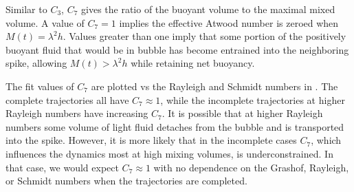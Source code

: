 Similar to $C_3$, $C_7$ gives the ratio of the buoyant volume to the maximal mixed volume.
A value of $C_7 = 1$ implies the effective Atwood number is zeroed when $M(t) = \lambda^2 h$.
Values greater than one imply that some portion of the positively buoyant fluid that would be in bubble has become entrained into the neighboring spike, allowing $M(t) > \lambda^2 h$ while retaining net buoyancy.

The fit values of $C_7$ are plotted vs the Rayleigh and Schmidt numbers in .
The complete trajectories all have $C_7 \approx 1$, while the incomplete trajectories at higher Rayleigh numbers have increasing $C_7$.
It is possible that at higher Rayleigh numbers some volume of light fluid detaches from the bubble and is transported into the spike.
However, it is more likely that in the incomplete cases $C_7$, which influences the dynamics most at high mixing volumes, is underconstrained.
In that case, we would expect $C_7 \approx 1$ with no dependence on the Grashof, Rayleigh, or Schmidt numbers when the trajectories are completed.


